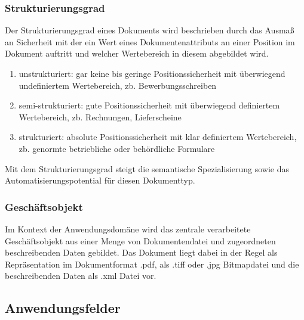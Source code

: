 \documentclass[11pt,oneside,a4paper,notitlepage]{article}
\begin{document}
\subsubsection{Strukturierungsgrad}
\label{sec:domaene-struturierungsgrad}

Der Strukturierungsgrad eines Dokuments wird beschrieben durch das Ausmaß an Sicherheit mit der ein Wert eines Dokumentenattributs
an einer Position im Dokument auftritt und welcher Wertebereich in diesem abgebildet wird.
	
\begin{enumerate}
\item unstrukturiert: gar keine bis geringe Positionssicherheit mit überwiegend undefiniertem Wertebereich, zb. Bewerbungsschreiben
\item semi-strukturiert: gute Positionssicherheit mit überwiegend definiertem Wertebereich, zb. Rechnungen, Lieferscheine
\item strukturiert: absolute Positionssicherheit mit klar definiertem Wertebereich, zb. genormte betriebliche oder behördliche Formulare
\end{enumerate}
\noindent
Mit dem Strukturierungsgrad steigt die semantische Spezialisierung sowie das Automatisierungspotential für diesen Dokumenttyp.

%
\subsubsection{Geschäftsobjekt}
Im Kontext der Anwendungsdomäne wird das zentrale verarbeitete Geschäftsobjekt aus einer Menge von Dokumentendatei und zugeordneten 
beschreibenden Daten gebildet. 
Das Dokument liegt dabei in der Regel als Repräsentation im Dokumentformat .pdf, als .tiff oder .jpg Bitmapdatei und die beschreibenden
Daten als .xml Datei vor.
%

%
\subsection{Anwendungsfelder}
\label{sec:domaene-anwendungsfelder}
\end{document}
